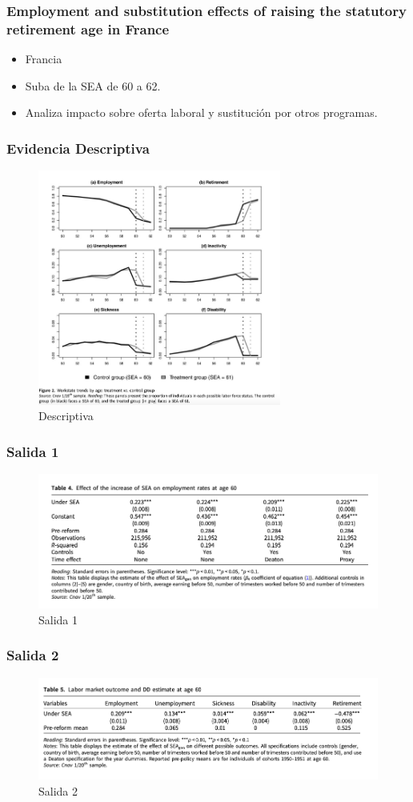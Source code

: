 \documentclass{beamer}
\begin{document}
  \frame
  {
     \frametitle{Employment and substitution effects of raising the statutory retirement age in France}
     \begin{itemize}
     \item Francia 
     \item Suba de la SEA de 60 a 62.
     \item Analiza impacto sobre oferta laboral y sustitución por otros programas.
     \end{itemize}
  }
  \frame
  {
    \frametitle{Evidencia Descriptiva}
      \begin{figure}[htp]
        \centering
        \includegraphics[width=8cm]{imgs/rabate-fig2}
        \caption{Descriptiva}
        \label{fig:fig2}
      \end{figure}
  }
  \frame
  {
    \frametitle{Salida 1}
      \begin{figure}[htp]
        \centering
        \includegraphics[width=12cm]{imgs/rabate-tab4}
        \caption{Salida 1}
        \label{fig:fig2}
      \end{figure}
  }
  \frame
  {
    \frametitle{Salida 2}
      \begin{figure}[htp]
        \centering
        \includegraphics[width=12cm]{imgs/rabate-tab5}
        \caption{Salida 2}
        \label{fig:fig2}
      \end{figure}
  }
\end{document}
